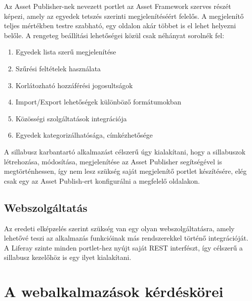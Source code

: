 \documentclass[hidelinks, 12pt, a4paper]{report}
\begin{document}
Az Asset Publisher-nek nevezett portlet az Asset Framework szerves részét képezi, amely az egyedek tetszés szerinti megjelenítéséért felelős. A megjelenítő teljes mértékben testre szabható, egy oldalon akár többet is el lehet helyezni belőle. A rengeteg beállítási lehetőségei közül csak néhányat sorolnék fel:
\begin{enumerate}
\item Egyedek lista szerű megjelenítése
\item Szűrési feltételek használata
\item Korlátozható hozzáférési jogosultságok
\item Import/Export lehetőségek különböző formátumokban
\item Közösségi szolgáltatások integrációja
\item Egyedek kategorizálhatósága, címkézhetősége
\end{enumerate}

A sillabusz karbantartó alkalmazást célszerű úgy kialakítani, hogy a sillabuszok létrehozása, módosítása, megjelenítése az Asset Publisher segítségével is megtörténhessen, így nem lesz szükség saját megjelenítő portlet készítésére, elég csak egy az Asset Publish-ert konfigurálni a megfelelő oldalakon.




\section{Webszolgáltatás}

Az eredeti elképzelés szerint szükség van egy olyan webszolgáltatásra, amely lehetővé teszi az alkalmazás funkcióinak más rendszerekkel történő integrációját. A Liferay szinte minden portlet-hez nyújt saját REST interfészt, így célszerű a sillabusz kezelőhöz is egy ilyet kialakítani.

\chapter{A webalkalmazások kérdéskörei}
\end{document}

